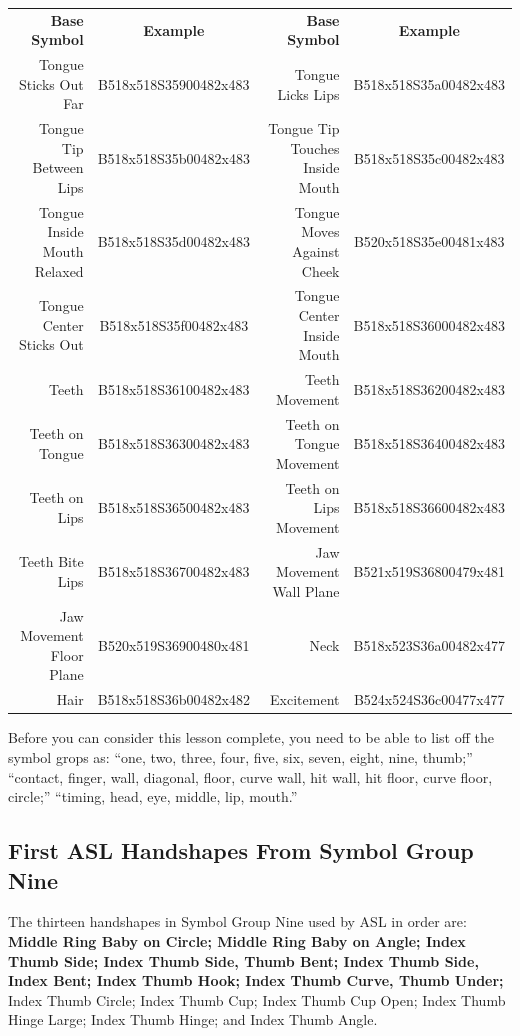\documentclass{article}
\begin{document}
\begin{center}
\begin{tabular}{rcrc}
\textbf{Base Symbol}&\textbf{Example}&\textbf{Base Symbol}&\textbf{Example}\\
Tongue Sticks Out Far      &B518x518S35900482x483&Tongue Licks Lips              &B518x518S35a00482x483\\
Tongue Tip Between Lips    &B518x518S35b00482x483&Tongue Tip Touches Inside Mouth&B518x518S35c00482x483\\
Tongue Inside Mouth Relaxed&B518x518S35d00482x483&Tongue Moves Against Cheek     &B520x518S35e00481x483\\
Tongue Center Sticks Out   &B518x518S35f00482x483&Tongue Center Inside Mouth     &B518x518S36000482x483\\
Teeth                      &B518x518S36100482x483&Teeth Movement                 &B518x518S36200482x483\\
Teeth on Tongue            &B518x518S36300482x483&Teeth on Tongue Movement       &B518x518S36400482x483\\
Teeth on Lips              &B518x518S36500482x483&Teeth on Lips Movement         &B518x518S36600482x483\\
Teeth Bite Lips            &B518x518S36700482x483&Jaw Movement Wall Plane        &B521x519S36800479x481\\
Jaw Movement Floor Plane   &B520x519S36900480x481&Neck                           &B518x523S36a00482x477\\
Hair                       &B518x518S36b00482x482&Excitement                     &B524x524S36c00477x477\\
\end{tabular}
\end{center}

Before you can consider this lesson complete, you need to be able to list off the symbol grops as:
``one, two, three, four, five, six, seven, eight, nine, thumb;''
``contact, finger, wall, diagonal, floor, curve wall, hit wall, hit floor, curve floor, circle;''
``timing, head, eye, middle, lip, mouth.''

\subsection{First ASL Handshapes From Symbol Group Nine}

The thirteen handshapes in Symbol Group Nine used by ASL in order are:
{\bf
Middle Ring Baby on Circle;
Middle Ring Baby on Angle;
Index Thumb Side;
Index Thumb Side, Thumb Bent;
Index Thumb Side, Index Bent;
Index Thumb Hook;
Index Thumb Curve, Thumb Under;
}
Index Thumb Circle;
Index Thumb Cup;
Index Thumb Cup Open;
Index Thumb Hinge Large;
Index Thumb Hinge;
and Index Thumb Angle.
\end{document}
